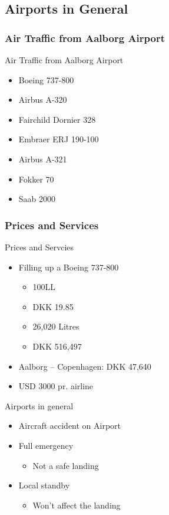 \subsection{Airports in General}

\subsubsection{Air Traffic from Aalborg Airport}
\begin{frame}{Air Traffic from Aalborg Airport}{}
	\begin{itemize}
		\item Boeing 737-800 
		\item Airbus A-320 
		\item Fairchild Dornier 328 
		\item Embraer ERJ 190-100 
		\item Airbus A-321 
		\item Fokker 70 
		\item Saab 2000 
	\end{itemize}
\end{frame}

\subsubsection{Prices and Services}
\begin{frame}{Prices and Servcies}{}
	\begin{itemize}
		\item Filling up a Boeing 737-800
			\begin{itemize}
				\item 100LL
				\item DKK 19.85
				\item 26,020 Litres
				\item DKK 516,497
			\end{itemize}
		\item Aalborg – Copenhagen: DKK 47,640
		\item USD 3000 pr. airline
	\end{itemize}
\end{frame}

\begin{frame}{Airports in general}{}
	\begin{itemize}
		\item Aircraft accident on Airport
		\item Full emergency
			\begin{itemize}
				\item Not a safe landing
			\end{itemize}
		\item Local standby
			\begin{itemize}
				\item Won't affect the landing
			\end{itemize}
	\end{itemize}
\end{frame}